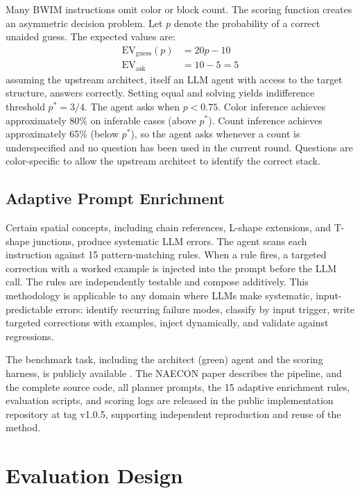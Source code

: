 \documentclass[10pt]{article}
\begin{document}
Many BWIM instructions omit color or block count. The scoring function
creates an asymmetric decision problem. Let $p$ denote the probability of
a correct unaided guess. The expected values are:
\begin{align}
  \mathrm{EV}_{\mathrm{guess}}(p) &= 20p - 10 \label{eq:ev_guess} \\
  \mathrm{EV}_{\mathrm{ask}} &= 10 - 5 = 5 \label{eq:ev_ask}
\end{align}
assuming the upstream architect, itself an LLM agent with access to the
target structure, answers correctly. Setting equal and solving yields
indifference threshold $p^* = 3/4$. The agent asks when $p < 0.75$.
Color inference achieves approximately 80\% on inferable cases (above
$p^*$). Count inference achieves approximately 65\% (below $p^*$), so the
agent asks whenever a count is underspecified and no question has been
used in the current round. Questions are color-specific to allow the
upstream architect to identify the correct stack.

\subsection{Adaptive Prompt Enrichment}

Certain spatial concepts, including chain references, L-shape extensions,
and T-shape junctions, produce systematic LLM errors. The agent scans
each instruction against 15 pattern-matching rules. When a rule fires, a
targeted correction with a worked example is injected into the prompt
before the LLM call. The rules are independently testable and compose
additively. This methodology is applicable to any domain where LLMs make
systematic, input-predictable errors: identify recurring failure modes,
classify by input trigger, write targeted corrections with examples,
inject dynamically, and validate against regressions.

The benchmark task, including the architect (green) agent and the scoring
harness, is publicly available \parencite{bwim}. The NAECON paper
\parencite{11674959} describes the pipeline, and the complete source code,
all planner prompts, the 15 adaptive enrichment rules, evaluation scripts,
and scoring logs are released in the public implementation repository
\parencite{bwimimpl} at tag v1.0.5, supporting independent reproduction and
reuse of the method.

\section{Evaluation Design}
\end{document}
